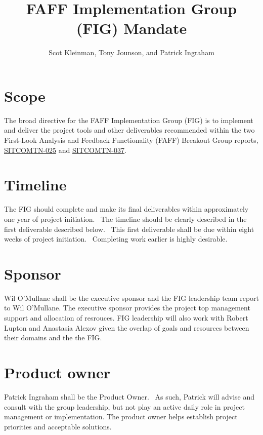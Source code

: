 \documentclass[SE,authoryear,lsstdraft]{lsstdoc}
\title{FAFF Implementation Group (FIG) Mandate}
\author{%
Scot Kleinman,
Tony Jounson,
and
Patrick Ingraham
}
\date{\vcsDate}
\newcommand{\tnlink}[1]{\href{https://ls.st/#1}{#1}}
\begin{document}
\maketitle

\section{Scope}
The broad directive for the FAFF Implementation Group (FIG) is to
implement and deliver the project tools and other deliverables recommended
within the two First-Look Analysis and Feedback Functionality (FAFF)
Breakout Group reports, \tnlink{SITCOMTN-025} and \tnlink{SITCOMTN-037}.

\section{Timeline}
The FIG should complete and make its final deliverables within
approximately one year of project initiation.  The timeline should be
clearly described in the first deliverable described below.  This first
deliverable shall be due within eight weeks of project initiation. 
Completing work earlier is highly desirable.


\section{Sponsor}
Wil O’Mullane shall be the executive sponsor and the FIG leadership
team report to Wil O’Mullane.  The executive sponsor provides the project top management support and allocation of resrouces.  
FIG leadership will also work with Robert Lupton and
Anastasia Alexov given the overlap of goals and
resources between their domains and the the FIG.



\section{Product owner}
Patrick Ingraham shall be the Product Owner.  As such, Patrick will
advise and consult with the group leadership, but not play an active
daily role in project management or implementation.  The product owner
helps establish project priorities and acceptable solutions.
\end{document}
